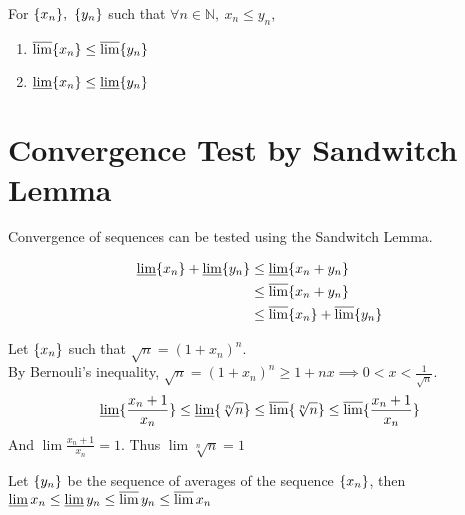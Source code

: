 	\begin{remark}
		For $\sequence{x_n},\ \sequence{y_n}$ such that $\forall n \in \mathbb{N},\ x_n \le y_n$,
		\begin{enumerate}
			\item $\varlimsup \{x_n\} \le \varlimsup \{y_n\}$
			\item $\varliminf \{x_n\} \le \varliminf \{y_n\}$
		\end{enumerate}
	\end{remark}

\section{Convergence Test by Sandwitch Lemma}
	Convergence of sequences can be tested using the Sandwitch Lemma.	
	\begin{remark}
		\begin{align*}
			\varliminf \{x_n\} + \varliminf \{y_n\} & \le \varliminf \{x_n + y_n\}\\ & \le \varlimsup \{x_n + y_n\}\\ & \le \varlimsup \{x_n\} + \varlimsup \{y_n\}
		\end{align*}
	\end{remark}

	\begin{remark}
		Let $\{x_n\}$ such that  $\sqrt{n} = (1+x_n)^n$.\\
		By Bernouli's inequality, $\sqrt{n} = (1+x_n)^n \ge 1+nx \implies 0<x<\frac{1}{\sqrt{n}}$.
		$$\varliminf \{\frac{x_n+1}{x_n}\} \le \varliminf \{\sqrt[n]{n}\} \le \varlimsup \{\sqrt[n]{n}\} \le \varlimsup \{\frac{x_n+1}{x_n}\}$$
		And $\lim \frac{x_n+1}{x_n} = 1$. Thus $\lim\sqrt[n]{n} = 1$
	\end{remark}

	\begin{remark}
		Let $\{y_n\}$ be the sequence of averages of the sequence $\{x_n\}$, then $\varliminf x_n \le \varliminf y_n \le \varlimsup y_n  \le \varlimsup x_n$
	\end{remark}

